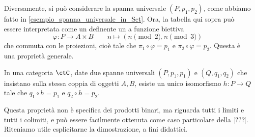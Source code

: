Diversamente, si può considerare la spanna universale \((P,p_1,p_2)\), come abbiamo fatto in \ref{esempio_spanna_universale_in_Set}. Ora, la tabella qui sopra può essere interpretata come un definente un a funzione biettiva
\[
\varphi\colon P\to A\times B \qquad n\mapsto (n\pmod2,n\pmod3)
\]
che commuta con le proiezioni, cioè  tale che \(\pi_1\circ\varphi=p_1\) e \(\pi_2\circ\varphi=p_2\). Questa è una proprietà generale.

\begin{proposition}
	In una categoria \(\ctC\), date due spanne universali \((P,p_1,p_1)\) e \((Q,q_1,q_2)\) che insistano sulla stessa coppia di oggetti \(A,B\), esiste un unico isomorfismo \(h\colon P\to Q\) tale che \(q_1\circ h=p_1\) e \(q_2\circ h=p_2\).
\end{proposition}
Questa proprietà non è specifica dei prodotti binari, ma riguarda tutti i limiti e tutti i colimiti, e può essere facilmente ottenuta come caso particolare della \ref{???}. Riteniamo utile esplicitarne la dimostrazione, a fini didattici. 
